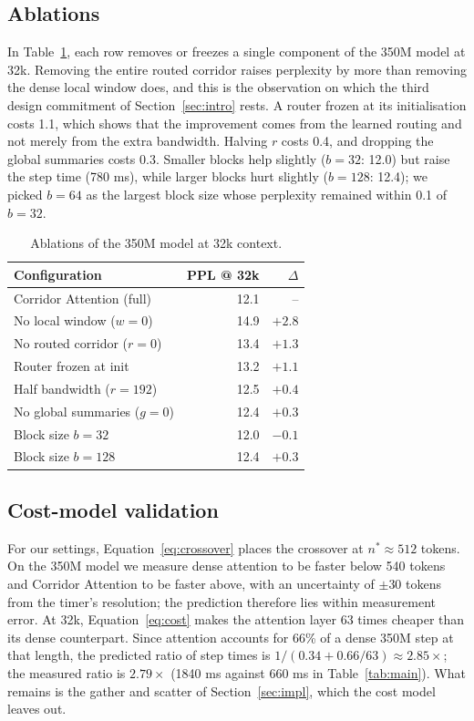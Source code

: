 \documentclass[11pt]{article}
\begin{document}
\subsection{Ablations}\label{sec:ablations}

In Table~\ref{tab:ablation}, each row removes or freezes a single component
of the 350M model at 32k. Removing the entire routed corridor raises
perplexity by more than removing the dense local window does, and this is the
observation on which the third design commitment of Section~\ref{sec:intro}
rests. A router frozen at its initialisation costs 1.1, which shows that the
improvement comes from the learned routing and not merely from the extra
bandwidth. Halving $r$ costs 0.4, and dropping the global summaries costs
0.3. Smaller blocks help slightly ($b = 32$: 12.0) but raise the step time
(780 ms), while larger blocks hurt slightly ($b = 128$: 12.4); we picked
$b = 64$ as the largest block size whose perplexity remained within 0.1 of
$b = 32$.

\begin{table}[t]
  \centering
  \begin{tabular}{lrr}
    \toprule
    Configuration & PPL @ 32k & $\Delta$ \\
    \midrule
    Corridor Attention (full)     & 12.1 & --     \\
    No local window ($w = 0$)     & 14.9 & $+2.8$ \\
    No routed corridor ($r = 0$)  & 13.4 & $+1.3$ \\
    Router frozen at init         & 13.2 & $+1.1$ \\
    Half bandwidth ($r = 192$)    & 12.5 & $+0.4$ \\
    No global summaries ($g = 0$) & 12.4 & $+0.3$ \\
    Block size $b = 32$           & 12.0 & $-0.1$ \\
    Block size $b = 128$          & 12.4 & $+0.3$ \\
    \bottomrule
  \end{tabular}
  \caption{Ablations of the 350M model at 32k context.}
  \label{tab:ablation}
\end{table}

\subsection{Cost-model validation}\label{sec:validation}

For our settings, Equation~\eqref{eq:crossover} places the crossover at
$n^{*} \approx 512$ tokens. On the 350M model we measure dense attention to
be faster below 540 tokens and Corridor Attention to be faster above, with
an uncertainty of $\pm 30$ tokens from the timer's resolution; the
prediction therefore lies within measurement error. At 32k,
Equation~\eqref{eq:cost} makes the attention layer 63 times cheaper than its
dense counterpart. Since attention accounts for 66\% of a dense 350M step at
that length, the predicted ratio of step times is
$1/(0.34 + 0.66/63) \approx 2.85\times$; the measured ratio is $2.79\times$
(1840 ms against 660 ms in Table~\ref{tab:main}). What remains is the gather
and scatter of Section~\ref{sec:impl}, which the cost model leaves out.
\end{document}
